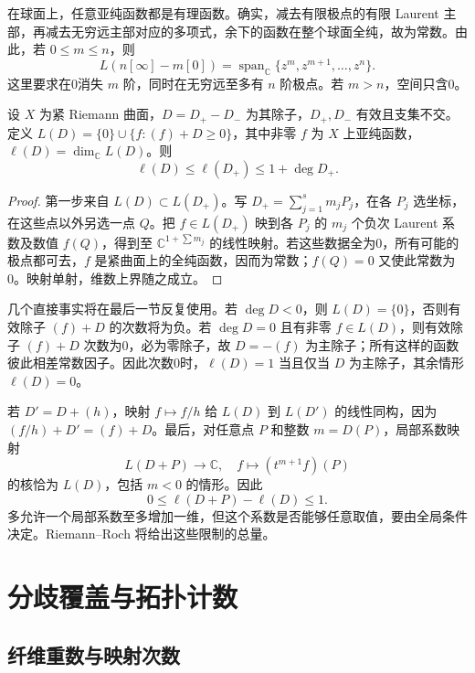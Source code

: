 \ProseParagraphBreak
在球面上，任意亚纯函数都是有理函数。确实，减去有限极点的有限 Laurent 主部，再减去无穷远主部对应的多项式，余下的函数在整个球面全纯，故为常数。由此，若 \(0\le m\le n\)，则
\[
 L(n[\infty]-m[0])
 =\operatorname{span}_{\mathbb C}\{z^m,z^{m+1},\ldots,z^n\}.
\]
这里要求在0消失 \(m\) 阶，同时在无穷远至多有 \(n\) 阶极点。若 \(m>n\)，空间只含0。

\begin{proposition}[允许极点空间的有限维性]\label{b3:prop:A-divisor-finite}
设 \(X\) 为紧 Riemann 曲面，\(D=D_+-D_-\) 为其除子，\(D_+,D_-\) 有效且支集不交。定义 \(L(D)=\{0\}\cup\{f:(f)+D\ge0\}\)，其中非零 \(f\) 为 \(X\) 上亚纯函数，\(\ell(D)=\dim_{\mathbb C}L(D)\)。则
\[
 \ell(D)\le\ell(D_+)\le1+\deg D_+.
\]
\end{proposition}
\begin{proof}
第一步来自 \(L(D)\subset L(D_+)\)。写 \(D_+=\sum_{j=1}^s m_jP_j\)，在各 \(P_j\) 选坐标，在这些点以外另选一点 \(Q\)。把 \(f\in L(D_+)\) 映到各 \(P_j\) 的 \(m_j\) 个负次 Laurent 系数及数值 \(f(Q)\)，得到至 \(\mathbb C^{1+\sum m_j}\) 的线性映射。若这些数据全为0，所有可能的极点都可去，\(f\) 是紧曲面上的全纯函数，因而为常数；\(f(Q)=0\) 又使此常数为0。映射单射，维数上界随之成立。
\end{proof}

几个直接事实将在最后一节反复使用。若 \(\deg D<0\)，则 \(L(D)=\{0\}\)，否则有效除子 \((f)+D\) 的次数将为负。若 \(\deg D=0\) 且有非零 \(f\in L(D)\)，则有效除子 \((f)+D\) 次数为0，必为零除子，故 \(D=-(f)\) 为主除子；所有这样的函数彼此相差常数因子。因此次数0时，\(\ell(D)=1\) 当且仅当 \(D\) 为主除子，其余情形 \(\ell(D)=0\)。

\ProseParagraphBreak
若 \(D'=D+(h)\)，映射 \(f\mapsto f/h\) 给 \(L(D)\) 到 \(L(D')\) 的线性同构，因为 \((f/h)+D'=(f)+D\)。最后，对任意点 \(P\) 和整数 \(m=D(P)\)，局部系数映射
\[
 L(D+P)\longrightarrow\mathbb C,
 \quad f\longmapsto(t^{m+1}f)(P)
\]
的核恰为 \(L(D)\)，包括 \(m<0\) 的情形。因此
\[
 0\le\ell(D+P)-\ell(D)\le1.
\]
多允许一个局部系数至多增加一维，但这个系数是否能够任意取值，要由全局条件决定。Riemann--Roch 将给出这些限制的总量。

\section{分歧覆盖与拓扑计数}
\label{b3:sec:A03}

\subsection{纤维重数与映射次数}
\label{b3:subsec:A0301}

